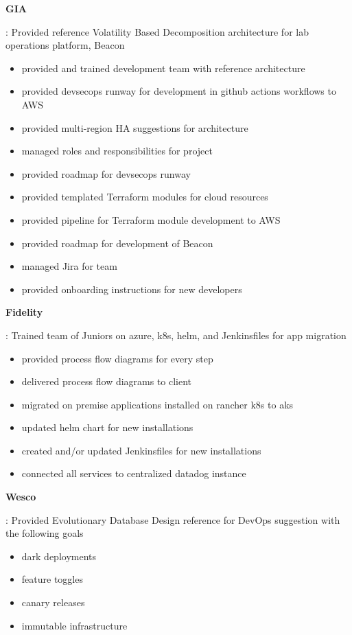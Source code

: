 \documentclass[letterpaper, 10pt]{extarticle}
\newcommand{\resumeItem}[2]{
\item\small{
    \textbf{#1}{: #2 \vspace{-2pt}}
  }
}
\begin{document}
\resumeItem{GIA}
{Provided reference Volatility Based Decomposition architecture for lab operations platform, Beacon

  \begin{itemize}
    \item provided and trained development team with reference architecture
    \item provided devsecops runway for development in github actions workflows to AWS
    \item provided multi-region HA suggestions for architecture
    \item managed roles and responsibilities for project
    \item provided roadmap for devsecops runway
    \item provided templated Terraform modules for cloud resources
    \item provided pipeline for Terraform module development to AWS
    \item provided roadmap for development of Beacon
    \item managed Jira for team
    \item provided onboarding instructions for new developers
  \end{itemize}

}

\resumeItem{Fidelity}
{Trained team of Juniors on azure, k8s, helm, and Jenkinsfiles for app migration

  \begin{itemize}
    \item provided process flow diagrams for every step
    \item delivered process flow diagrams to client
    \item migrated on premise applications installed on rancher k8s to aks
    \item updated helm chart for new installations
    \item created and/or updated Jenkinsfiles for new installations
    \item connected all services to centralized datadog instance
  \end{itemize}

}

\resumeItem{Wesco}
{Provided Evolutionary Database Design reference for DevOps suggestion with the following goals

  \begin{itemize}
    \item dark deployments
    \item feature toggles
    \item canary releases
    \item immutable infrastructure
  \end{itemize}

}
\end{document}
